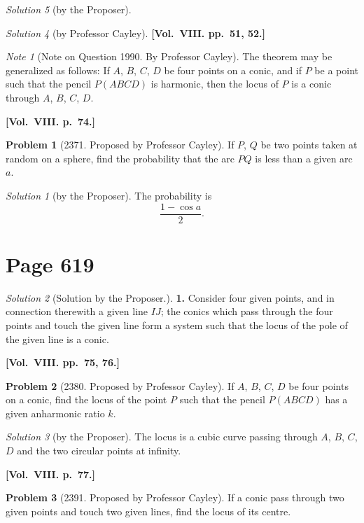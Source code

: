\documentclass[12pt,a4paper]{article}
\theoremstyle{plain}
\theoremstyle{definition}
\newtheorem{problem}{Problem}
\theoremstyle{remark}
\newtheorem*{solution}{Solution}
\newtheorem*{note}{Note}
\begin{document}
\begin{solution}[by the Proposer]
\begin{solution}[by Professor Cayley]
\medskip\noindent\textbf{[Vol.~VIII. pp.~51, 52.]}

\begin{note}[Note on Question 1990. By Professor Cayley]
The theorem may be generalized as follows: If $A$, $B$, $C$, $D$ be four points on a conic, and if $P$ be a point such that the pencil $P(ABCD)$ is harmonic, then the locus of $P$ is a conic through $A$, $B$, $C$, $D$.
\end{note}

\medskip\noindent\textbf{[Vol.~VIII. p.~74.]}

\begin{problem}[2371. Proposed by Professor Cayley]
If $P$, $Q$ be two points taken at random on a sphere, find the probability that the arc $PQ$ is less than a given arc $a$.
\end{problem}

\begin{solution}[by the Proposer]
The probability is
\[
\frac{1 - \cos a}{2}.
\]
\end{solution}

\section*{Page 619}
\setcounter{page}{619}

\begin{solution}[Solution by the Proposer.]
\textbf{1.} Consider four given points, and in connection therewith a given line $IJ$; the conics which pass through the four points and touch the given line form a system such that the locus of the pole of the given line is a conic.
\end{solution}

\medskip\noindent\textbf{[Vol.~VIII. pp.~75, 76.]}

\begin{problem}[2380. Proposed by Professor Cayley]
If $A$, $B$, $C$, $D$ be four points on a conic, find the locus of the point $P$ such that the pencil $P(ABCD)$ has a given anharmonic ratio $k$.
\end{problem}

\begin{solution}[by the Proposer]
The locus is a cubic curve passing through $A$, $B$, $C$, $D$ and the two circular points at infinity.
\end{solution}

\medskip\noindent\textbf{[Vol.~VIII. p.~77.]}

\begin{problem}[2391. Proposed by Professor Cayley]
If a conic pass through two given points and touch two given lines, find the locus of its centre.
\end{problem}


\end{solution}
\end{solution}
\end{document}
